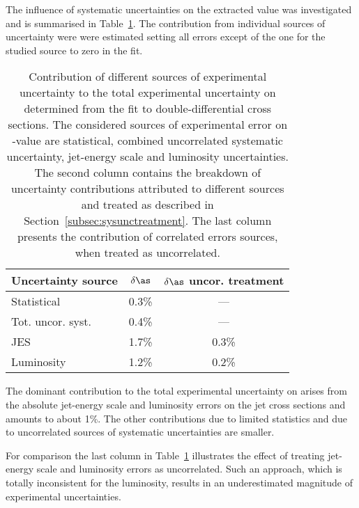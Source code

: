 The influence of systematic uncertainties on the extracted \asz value was investigated and is summarised in Table~\ref{tab:asuncbreakdown}. The contribution from individual sources of uncertainty were were estimated setting all errors except of the one for the studied source to zero in the \as fit.
\begin{table}
\centering
\begin{tabular}{|l|c|c|}
 \hline
 Uncertainty source & $\delta\as$ & $\delta\as$ uncor. treatment\\
 \hline\hline
 Statistical       & 0.3\% & ---     \\
 Tot. uncor. syst. & 0.4\% & ---     \\
 JES               & 1.7\% & 0.3\%   \\
 Luminosity        & 1.2\% & 0.2\%   \\
 \hline
\end{tabular}
\caption{Contribution of different sources of experimental uncertainty to the total experimental uncertainty on \asz determined from the fit to double-differential cross sections. The considered sources of experimental error on \asz-value are statistical, combined uncorrelated systematic uncertainty, jet-energy scale and luminosity uncertainties. The second column contains the breakdown of uncertainty contributions attributed to different sources and treated as described in Section~\ref{subsec:sysunctreatment}. The last column presents the contribution of correlated errors sources, when treated as uncorrelated.}
\label{tab:asuncbreakdown}
\end{table}

The dominant contribution to the total experimental uncertainty on \as arises from the absolute jet-energy scale and luminosity errors on the jet cross sections and amounts to about 1\%. The other contributions due to limited statistics and due to uncorrelated sources of systematic uncertainties are smaller. 

For comparison the last column in Table~\ref{tab:asuncbreakdown} illustrates the effect of treating jet-energy scale and luminosity errors as uncorrelated. Such an approach, which is totally inconsistent for the luminosity, results in an underestimated magnitude of experimental uncertainties.